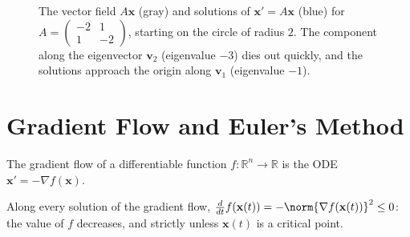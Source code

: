 \begin{figure}[ht]
    \centering
    \caption{The vector field $A\mathbf{x}$ (gray) and solutions of $\mathbf{x}' = A\mathbf{x}$ (blue) for $A = \left(\begin{smallmatrix} -2 & 1 \\ 1 & -2 \end{smallmatrix}\right)$, starting on the circle of radius $2$. The component along the eigenvector $\mathbf{v}_2$ (eigenvalue $-3$) dies out quickly, and the solutions approach the origin along $\mathbf{v}_1$ (eigenvalue $-1$).}
    \label{L5-fig:ode}
\end{figure}

\section{Gradient Flow and Euler's Method}\label{L5-sec:euler}


\begin{definition}\label{L5-def:gradient-flow}
    The gradient flow of a differentiable function $f: \mathbb{R}^n \to \mathbb{R}$ is the ODE $\mathbf{x}' = -\nabla f(\mathbf{x})$.
\end{definition}

\begin{proposition}\label{L5-prop:gradient-flow}
    Along every solution of the gradient flow, $\frac{d}{dt}f(\mathbf{x}(t)) = -\norm{\nabla f(\mathbf{x}(t))}^2 \leq 0$: the value of $f$ decreases, and strictly unless $\mathbf{x}(t)$ is a critical point.
\end{proposition}

